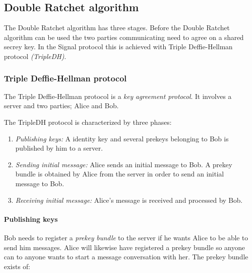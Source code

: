 \subsection{Double Ratchet algorithm}

The Double Ratchet algorithm has three stages. 
Before the Double Ratchet algorithm can be used the two parties communicating need to agree on a shared secrey key. In the Signal protocol this is achieved with Triple Deffie-Hellman protocol \emph{(TripleDH)}.

\subsubsection{Triple Deffie-Hellman protocol}

The Triple Deffie-Hellman protocol is a \emph{key agreement protocol}. It involves a server and two parties; Alice and Bob. 

The TripleDH protocol is characterized by three phases:

\begin{enumerate}
	\item \emph{Publishing keys:} A identity key and several prekeys belonging to Bob is published by him to a server.
	\item \emph{Sending initial message:} Alice sends an initial message to Bob. A prekey bundle is obtained by Alice from the server in order to send an initial message to Bob.
	\item \emph{Receiving initial message:} Alice's message is received and processed by Bob.
\end{enumerate}

\paragraph{Publishing keys}
Bob needs to register a \emph{prekey bundle} to the server if he wants Alice to be able to send him messages. Alice will likewise have registered a prekey bundle so anyone can to anyone wants to start a message conversation with her.  
The prekey bundle exists of:

